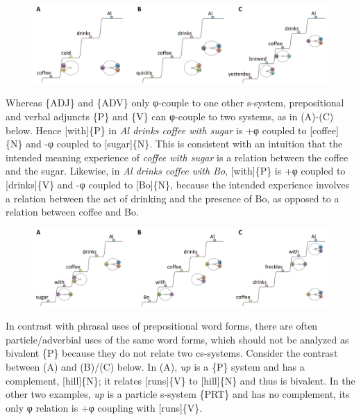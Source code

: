   
\begin{figure}
\includegraphics[width=\textwidth]{figures/Tilsen-img83.png}
\caption{\missingcaption}
\label{fig:}
\end{figure}
 

  Whereas \{ADJ\} and \{ADV\} only φ-couple to one other s-system, prepositional and verbal adjuncts \{P\} and \{V\} can φ-couple to two systems, as in (A)-(C) below. Hence [with]\{P\} in \textit{Al drinks coffee with sugar} is +φ coupled to [coffee]\{N\} and -φ coupled to [sugar]\{N\}. This is consistent with an intuition that the intended meaning experience of \textit{coffee with sugar} is a relation between the coffee and the sugar. Likewise, in \textit{Al drinks coffee with Bo}, [with]\{P\} is +φ coupled to [drinks]\{V\} and -φ coupled to [Bo]\{N\}, because the intended experience involves a relation between the act of drinking and the presence of Bo, as opposed to a relation between coffee and Bo.

  
\begin{figure}
\includegraphics[width=\textwidth]{figures/Tilsen-img84.png}
\caption{\missingcaption}
\label{fig:}
\end{figure}
 

  In contrast with phrasal uses of prepositional word forms, there are often particle/adverbial uses of the same word forms, which should not be analyzed as bivalent \{P\} because they do not relate two cs-systems. Consider the contrast between (A) and (B)/(C) below. In (A), \textit{up} is a \{P\} system and has a complement, [hill]\{N\}; it relates [runs]\{V\} to [hill]\{N\} and thus is bivalent. In the other two examples, \textit{up} is a particle s-system \{PRT\} and has no complement, its only φ relation is +φ coupling with [runs]\{V\}.

